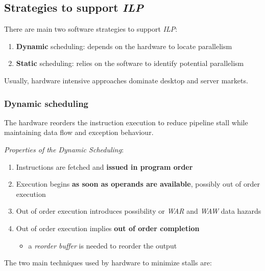 \documentclass[english]{article}
\begin{document}
\subsection{Strategies to support \textit{ILP}}
\label{sec:strategies-to-support-ilp}

There are main two software strategies to support \textit{ILP}:

\begin{enumerate}
  \item \textbf{Dynamic} scheduling: depends on the hardware to locate parallelism
  \item \textbf{Static} scheduling: relies on the software to identify potential parallelism
\end{enumerate}

Usually, hardware intensive approaches dominate desktop and server markets.

\subsubsection{Dynamic scheduling}

The hardware reorders the instruction execution to reduce pipeline stall while maintaining data flow and exception behaviour.

\bigskip
\textit{Properties of the Dynamic Scheduling}:

\begin{enumerate}
  \item Instructions are fetched and \textbf{issued in program order}
  \item Execution begins \textbf{as soon as operands are available}, possibly out of order execution
  \item Out of order execution introduces possibility or \textit{WAR} and \textit{WAW} data hazards
  \item Out of order execution implies \textbf{out of order completion}
        \begin{itemize}
          \item a \textit{reorder buffer} is needed to reorder the output
        \end{itemize}
\end{enumerate}

\bigskip
The two main techniques used by hardware to minimize stalls are:
\end{document}
